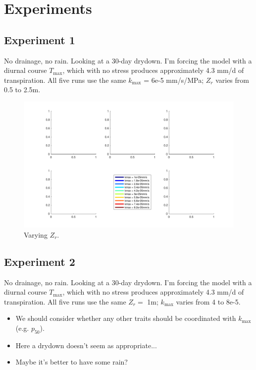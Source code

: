 \documentclass[11pt]{article}
\begin{document}
\clearpage
\section{Experiments}

\subsection{Experiment 1}
No drainage, no rain. Looking at a 30-day drydown. I'm forcing the model with a diurnal course $T_\text{max}$, which with no stress produces approximately 4.3 mm/d of transpiration. All five runs use the same $k_\text{max}$ = 6e-5 mm/s/MPa; $Z_r$ varies from 0.5 to 2.5m.

\begin{figure}[h]
\centering
\includegraphics[width=35pc]{../figs/exp1}
\caption{Varying $Z_r$.}
\label{fig:exp1}
\end{figure}

\clearpage
\subsection{Experiment 2}
No drainage, no rain. Looking at a 30-day drydown. I'm forcing the model with a diurnal course $T_\text{max}$, which with no stress produces approximately 4.3 mm/d of transpiration. All five runs use the same $Z_r=$ 1m; $k_\text{max}$ varies from 4 to 8e-5.

\begin{itemize}
\item We should consider whether any other traits should be coordinated with $k_\text{max}$ (e.g. $p_{50}$).
\item Here a drydown doesn't seem as appropriate...
\item Maybe it's better to have some rain?
\end{itemize}
\end{document}
